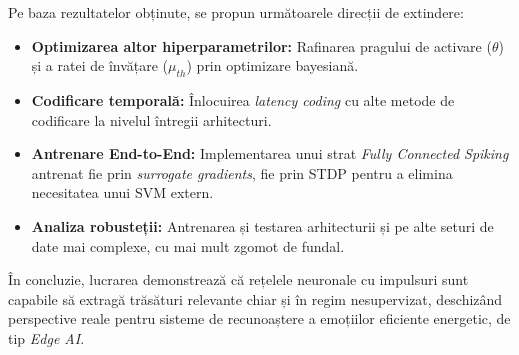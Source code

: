 Pe baza rezultatelor obținute, se propun următoarele direcții de extindere:
\begin{itemize}
	\item \textbf{Optimizarea altor hiperparametrilor:} Rafinarea pragului de activare ($\theta$) și a ratei de învățare ($\mu_{th}$) prin optimizare bayesiană.
	\item \textbf{Codificare temporală:} Înlocuirea \textit{latency coding} cu alte metode de codificare la nivelul întregii arhitecturi.
	\item \textbf{Antrenare End-to-End:} Implementarea unui strat \textit{Fully Connected Spiking} antrenat fie prin \textit{surrogate gradients}, fie prin STDP pentru a elimina necesitatea unui SVM extern.
	\item \textbf{Analiza robusteții:} Antrenarea și testarea arhitecturii și pe alte seturi de date mai complexe, cu mai mult zgomot de fundal.
\end{itemize}

În concluzie, lucrarea demonstrează că rețelele neuronale cu impulsuri sunt capabile să extragă trăsături relevante chiar și în regim nesupervizat, deschizând perspective reale pentru sisteme de recunoaștere a emoțiilor eficiente energetic, de tip \textit{Edge AI}.

